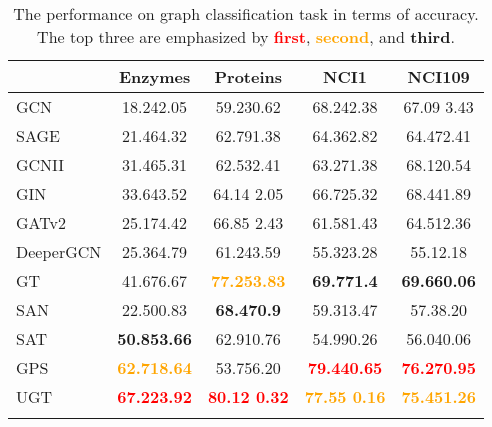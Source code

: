 \documentclass[oneside]{article}
\begin{document}
    




    

































\begin{table}[t]
\centering
\fontsize{10 pt}{13 pt}\selectfont
\begin{adjustbox}{width = 0.5 \textwidth}

  \begin{tabular}{l  cccc}
    \toprule
    & Enzymes & Proteins & NCI1 & NCI109  \\\hline \hline
    GCN& 18.242.05 &  59.230.62 & 68.242.38&  67.09  3.43 \\
    SAGE & 21.464.32 &  62.791.38 &  64.362.82 &  64.472.41 \\
    GCNII &31.465.31& 62.532.41&  63.271.38& 68.120.54 \\
    GIN & 33.643.52 & 64.14  2.05&  66.725.32 &68.441.89 \\
    GATv2 &  25.174.42&  66.85 2.43&  61.581.43&  64.512.36 \\
    DeeperGCN  &25.364.79 &  61.243.59 & 55.323.28&  55.12.18 \\\hline
    
    GT & 41.676.67 & \textcolor{orange}{\textbf{77.253.83 }}& \textbf{69.771.4}&  \textbf{69.660.06}\\
    SAN & 22.500.83 &\textbf{68.470.9 }& 59.313.47  & 57.38.20\\
    SAT& {\textbf{50.853.66  }}&62.910.76 &54.990.26 &  56.040.06\\
    GPS &\textcolor{orange}{\textbf{ 62.718.64}} & 53.756.20 &  \textcolor{red}{\textbf{79.440.65  }}& \textcolor{red}{\textbf{76.270.95}}\\\hline
    
    UGT  & \textcolor{red}{\textbf{67.223.92}} &\textcolor{red}{\textbf{80.12 0.32}} & \textcolor{orange}{\textbf{77.55 0.16 }}& \textcolor{orange}{\textbf{75.451.26}}\\\hline  
    \newline
\end{tabular}
\newline
\end{adjustbox}
\caption{The performance on graph classification task in terms of accuracy. 
The top three are emphasized by \textcolor{red}{\textbf{first}}, \textcolor{orange}{\textbf{second}}, and \textbf{third}.   }
  \label{tab:graph_classification}
\end{table}
\end{document}
